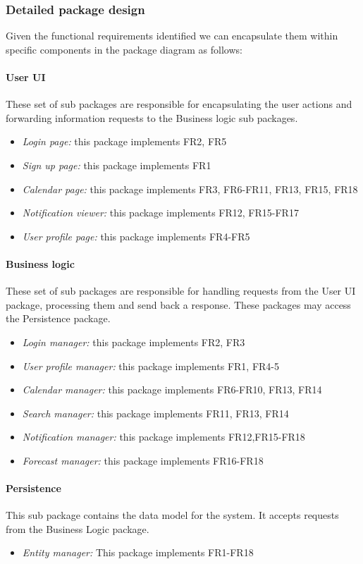 \documentclass[10pt,a4paper,titlepage]{article}
\begin{document}
\subsubsection{Detailed package design}
Given the functional requirements identified we can encapsulate them within specific components in the package diagram as follows:

\paragraph{User UI}
These set of sub packages are responsible for encapsulating the user actions and forwarding information requests to the Business logic sub packages.
\begin{itemize}
\item \emph{Login page:} this package implements FR2, FR5
\item \emph{Sign up page:} this package implements FR1
\item \emph{Calendar page:} this package implements FR3, FR6-FR11, FR13, FR15, FR18
\item \emph{Notification viewer:} this package implements FR12, FR15-FR17
\item \emph{User profile page:} this package implements FR4-FR5
\end{itemize}

\paragraph{Business logic}
These set of sub packages are responsible for handling requests from the User UI package, processing them and send back a response. These packages may access the Persistence package.
\begin{itemize}
\item \emph{Login manager:} this package implements FR2, FR3
\item \emph{User profile manager:} this package implements FR1, FR4-5
\item \emph{Calendar manager:} this package implements FR6-FR10, FR13, FR14
\item \emph{Search manager:} this package implements FR11, FR13, FR14
\item \emph{Notification manager:} this package implements FR12,FR15-FR18
\item \emph{Forecast manager:} this package implements FR16-FR18
\end{itemize}

\paragraph{Persistence}
This sub package contains the data model for the system. It accepts requests from the Business Logic package.
\begin{itemize}
\item \emph{Entity manager:} This package implements FR1-FR18
\end{itemize}
\end{document}
